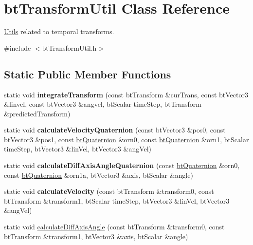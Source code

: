 \hypertarget{classbtTransformUtil}{}\section{bt\+Transform\+Util Class Reference}
\label{classbtTransformUtil}


\hyperlink{classUtils}{Utils} related to temporal transforms.  




{\ttfamily \#include $<$bt\+Transform\+Util.\+h$>$}

\subsection*{Static Public Member Functions}
\begin{DoxyCompactItemize}
\item 
\mbox{\label{classbtTransformUtil_ac943ee956ab17687013a60a5918b23e4}} 
static void {\bfseries integrate\+Transform} (const bt\+Transform \&cur\+Trans, const bt\+Vector3 \&linvel, const bt\+Vector3 \&angvel, bt\+Scalar time\+Step, bt\+Transform \&predicted\+Transform)
\item 
\mbox{\label{classbtTransformUtil_a291f6db1cc528595ad710ab8f256b98a}} 
static void {\bfseries calculate\+Velocity\+Quaternion} (const bt\+Vector3 \&pos0, const bt\+Vector3 \&pos1, const \hyperlink{classbtQuaternion}{bt\+Quaternion} \&orn0, const \hyperlink{classbtQuaternion}{bt\+Quaternion} \&orn1, bt\+Scalar time\+Step, bt\+Vector3 \&lin\+Vel, bt\+Vector3 \&ang\+Vel)
\item 
\mbox{\label{classbtTransformUtil_a11daea5e8931d47ceaf56aee74dadf96}} 
static void {\bfseries calculate\+Diff\+Axis\+Angle\+Quaternion} (const \hyperlink{classbtQuaternion}{bt\+Quaternion} \&orn0, const \hyperlink{classbtQuaternion}{bt\+Quaternion} \&orn1a, bt\+Vector3 \&axis, bt\+Scalar \&angle)
\item 
\mbox{\label{classbtTransformUtil_adea3509ccb6eb65675a102c80aa1b312}} 
static void {\bfseries calculate\+Velocity} (const bt\+Transform \&transform0, const bt\+Transform \&transform1, bt\+Scalar time\+Step, bt\+Vector3 \&lin\+Vel, bt\+Vector3 \&ang\+Vel)
\item 
static void \hyperlink{classbtTransformUtil_a39f53b05940a57082053067bd5e337ec}{calculate\+Diff\+Axis\+Angle} (const bt\+Transform \&transform0, const bt\+Transform \&transform1, bt\+Vector3 \&axis, bt\+Scalar \&angle)

\end{DoxyCompactItemize}
